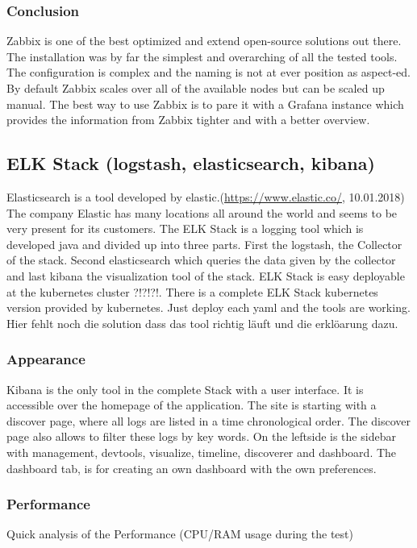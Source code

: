 \subsubsection{Conclusion}
Zabbix is one of the best optimized and extend open-source solutions out there. The installation was by far the simplest and overarching of all the tested tools. The configuration is complex and the naming is not at ever position as aspect-ed. By default Zabbix scales over all of the available nodes but can be scaled up manual. The best way to use Zabbix is to pare it with a Grafana instance which provides the information from Zabbix tighter and with a better overview.

\subsection{ELK Stack (logstash, elasticsearch, kibana)}
\label{elk} %
Elasticsearch is a tool developed by elastic.(\url{https://www.elastic.co/}, 10.01.2018) The company Elastic has many locations all around the world and seems to be very present for its customers.
The ELK Stack is a logging tool which is developed java and divided up into three parts. First the logstash, the Collector of the stack. Second elasticsearch which queries the data given by the collector and last kibana the visualization tool of the stack.
ELK Stack is easy deployable at the kubernetes cluster ?!?!?!. There is a complete ELK Stack kubernetes version provided by kubernetes. Just deploy each yaml and the tools are working. Hier fehlt noch die solution dass das tool richtig läuft und die erklöarung dazu.

\subsubsection{Appearance}%
Kibana is the only tool in the complete Stack with a user interface. It is accessible over the homepage of the application. The site is starting with a discover page, where all logs are listed in a time chronological order. The discover page also allows to filter these logs by key words. On the leftside is the sidebar with management, devtools, visualize, timeline, discoverer and dashboard. The dashboard tab, is for creating an own dashboard with the own preferences.
\subsubsection{Performance}
Quick analysis of the Performance (CPU/RAM usage during the test)
